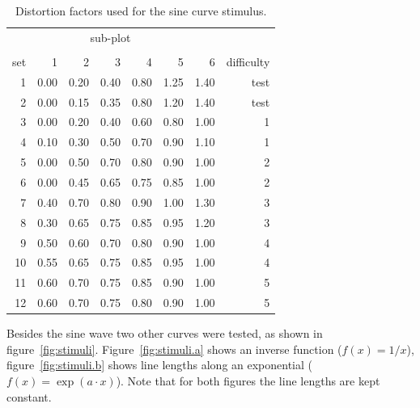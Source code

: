 \documentclass[journal]{vgtc}\usepackage{graphicx, color}
\begin{document}
\begin{table}[ht]
\centering
\begin{tabular}{rrrrrrrr}
  \hline
  & \multicolumn{5}{c}{sub-plot}\\\cline{2-7}\\ [-1.75ex]
set \vphantom{hp}& 1 & 2 & 3 & 4 & 5 & 6 & difficulty\\ 
  \hline
1 & 0.00 & 0.20 & 0.40 & 0.80 & 1.25 & 1.40 & test\\ 
  2 & 0.00 & 0.15 & 0.35 & 0.80 & 1.20 & 1.40 & test\\ 
  3 & 0.00 & 0.20 & 0.40 & 0.60 & 0.80 & 1.00 & 1 \\ 
  4 & 0.10 & 0.30 & 0.50 & 0.70 & 0.90 & 1.10 & 1 \\  
  5 & 0.00 & 0.50 & 0.70 & 0.80 & 0.90 & 1.00 & 2 \\ 
  6 & 0.00 & 0.45 & 0.65 & 0.75 & 0.85 & 1.00 & 2 \\ 
  7 & 0.40 & 0.70 & 0.80 & 0.90 & 1.00 & 1.30 & 3 \\  
  8 & 0.30 & 0.65 & 0.75 & 0.85 & 0.95 & 1.20 & 3 \\ 
  9 & 0.50 & 0.60 & 0.70 & 0.80 & 0.90 & 1.00 &  4 \\  
  10 & 0.55 & 0.65 & 0.75 & 0.85 & 0.95 & 1.00 & 4 \\ 
  11 & 0.60 & 0.70 & 0.75 & 0.85 & 0.90 & 1.00 & 5\\ 
  12 & 0.60 & 0.70 & 0.75 & 0.80 & 0.90 & 1.00 & 5\\ 
   \hline
\end{tabular}
\caption{\label{tab:w} Distortion factors used for the sine curve stimulus.}
\end{table}

Besides the sine wave two other curves were tested, as shown in figure~\ref{fig:stimuli}. Figure~\ref{fig:stimuli.a} shows an inverse function ($f(x) = 1/x$),  figure~\ref{fig:stimuli.b} shows line lengths along an exponential ($f(x) = \exp(a \cdot x)$). Note that for both figures the line lengths are kept constant.
\end{document}
